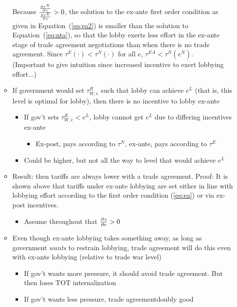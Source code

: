 \begin{itemize}
\begin{itemize}
\begin{equation}
						\label{eq:ea2}
					\end{equation}
				Because $\frac{\frac{\partial \tau^N}{\partial \gamma}}{\frac{\partial \tau^E}{\partial \gamma}} > 0$, the solution to the ex-ante first order condition as given in Equation~(\ref{eq:ea2}) is smaller than the solution to Equation~(\ref{eq:nta}), so that the lobby exerts less effort in the ex-ante stage of trade agreement negotiations than when there is no trade agreement. Since $\tau^E(\cdot) < \tau^N(\cdot)$ for all $e$, $\tau^{EA} < \tau^N(e^N)$. \\
			(Important to give intuition since increased incentive to exert lobbying effort...)
				\item If government would set $\tau^R_{W,e}$ such that lobby can achieve $e^L$ (that is, this level is optimal for lobby), then there is no incentive to lobby ex-ante
		\begin{itemize}
			\item If gov't sets $\tau^R_{W,e} < e^L$, lobby cannot get $e^L$ due to differing incentives ex-ante 
						\begin{itemize}
							\item Ex-post, pays according to $\tau^N$, ex-ante, pays according to $\tau^E$
						\end{itemize}
					\item Could be higher, but not all the way to level that would achieve $e^L$
				\end{itemize}
			\item Result: then tariffs are always lower with a trade agreement.
			Proof: It is shown above that tariffs under ex-ante lobbying are set either in line with lobbying effort according to the first order condition (\ref{eq:ea}) or via ex-post incentives. 
				\begin{itemize}
					\item Assume throughout that $\frac{\partial \gamma}{\partial e} > 0$
				\end{itemize}
			\item Even though ex-ante lobbying takes something away, as long as government \textit{wants} to restrain lobbying, trade agreement will do this even with ex-ante lobbying (relative to trade war level)
				\begin{itemize}
					\item If gov't wants more pressure, it should avoid trade agreement. But then loses TOT internalization
					\item If gov't wants less pressure, trade agreementdoubly good
						\begin{itemize}

\end{itemize}
\end{itemize}
\end{itemize}
\end{itemize}
